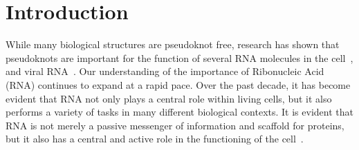 \documentclass{doublecol-new}
\theoremstyle{TH}{
\newtheorem{lemma}{Lemma}
\newtheorem{theorem}[lemma]{Theorem}
\newtheorem{corrolary}[lemma]{Corrolary}
\newtheorem{conjecture}[lemma]{Conjecture}
\newtheorem{proposition}[lemma]{Proposition}
\newtheorem{claim}[lemma]{Claim}
\newtheorem{stheorem}[lemma]{Wrong Theorem}
\newtheorem{algorithm}{Algorithm}
}
\theoremstyle{THrm}{
\newtheorem{definition}{Definition}
\newtheorem{question}{Question}
\newtheorem{remark}{Remark}
\newtheorem{scheme}{Scheme}
}
\theoremstyle{THhit}{
\newtheorem{case}{Case}[section]
}
\def\tc{\textcolor{red}}
\begin{document}



\maketitle

\section{Introduction}
\label{sec-introduction}
While many biological
structures are pseudoknot free, research has shown that pseudoknots
are important for the function of several RNA molecules in the
cell~\cite{staple-butcher-05, DBLP:journals/nar/BatenburgGP01}, and
viral RNA~\cite{deiman-pleij-97}.
Our understanding of the importance of Ribonucleic Acid (RNA) continues
to expand at a rapid pace. %
Over the past decade, it has become evident that RNA not only plays a central role
within living cells, but it also performs a variety of tasks in many different
biological contexts. It is evident that RNA is not merely a passive messenger
of information and scaffold for proteins, but it also has a central and active
role in the functioning of the cell~\cite{NissenPoul2000}.
\end{document}
